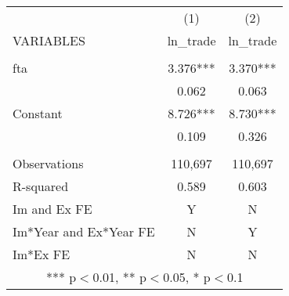 \documentclass[]{article}
\begin{document}
\begin{tabular}{lcc} \hline
 & (1) & (2) \\
VARIABLES & ln\_trade & ln\_trade \\ \hline
 &  &  \\
fta & 3.376*** & 3.370*** \\
 & 0.062 & 0.063 \\
Constant & 8.726*** & 8.730*** \\
 & 0.109 & 0.326 \\
 &  &  \\
Observations & 110,697 & 110,697 \\
R-squared & 0.589 & 0.603 \\
Im and Ex FE & Y & N \\
Im*Year and Ex*Year FE & N & Y \\
 Im*Ex FE & N & N \\ \hline
\multicolumn{3}{c}{ *** p$<$0.01, ** p$<$0.05, * p$<$0.1} \\
\end{tabular}
\end{document}
